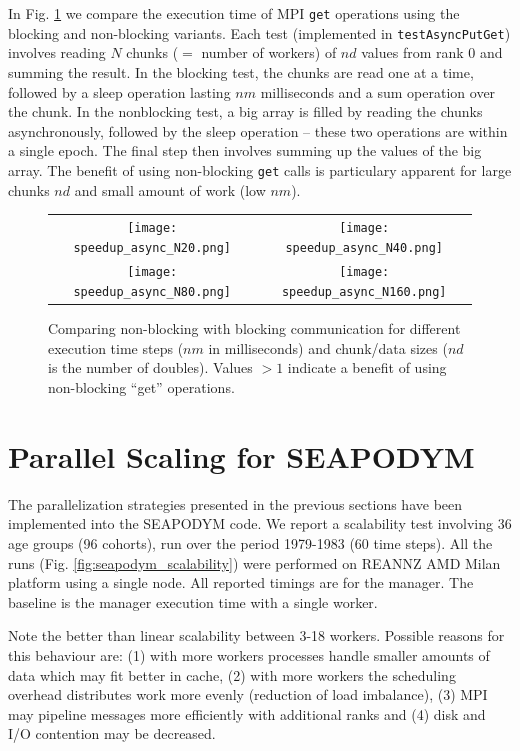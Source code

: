 \documentclass[a4paper,oneside,12pt]{article}
\begin{document}
In Fig. \ref{fig:async} we compare the  execution time of MPI \verb|get| operations using 
the blocking and non-blocking variants. Each test (implemented in \verb|testAsyncPutGet|) involves reading $N$ chunks ($=$ number of workers) 
of $nd$ values from rank 0 and summing the result. In the blocking test, the chunks are read one at a 
time, followed by a sleep operation lasting $nm$ milliseconds and a sum operation over the chunk. 
In the nonblocking test, a big array is filled by reading the chunks asynchronously, followed by the 
sleep operation -- these two operations are within a single epoch. The final step then involves summing up the values
of the big array. The benefit of using non-blocking \verb|get| calls is particulary apparent for large chunks 
$nd$ and small amount of work (low $nm$).

\begin{figure}
\begin{tabular}{cc}
      \texttt{[image: speedup\_async\_N20.png]} & \texttt{[image: speedup\_async\_N40.png]} \\
      \texttt{[image: speedup\_async\_N80.png]} & \texttt{[image: speedup\_async\_N160.png]} \\
\end{tabular}
\caption{Comparing non-blocking with blocking communication for different execution time steps ($nm$ in milliseconds) 
and chunk/data sizes ($nd$ is the number of doubles). Values $> 1$ indicate a benefit of using non-blocking ``get'' operations.}
\label{fig:async}
\end{figure}

\section{Parallel Scaling for SEAPODYM}

The parallelization strategies presented in the previous sections have been implemented into the SEAPODYM code. 
We report a scalability test involving 36 age groups (96 cohorts), run over the period 1979-1983 (60 time steps). 
All the runs (Fig. \ref{fig:seapodym_scalability}) were performed on REANNZ AMD Milan
platform using a single node. All reported timings are for the manager. The baseline is the manager execution time 
with a single worker.

Note the better than linear scalability between 3-18 workers. Possible reasons for this behaviour are:
(1) with more workers processes handle smaller amounts of data which may fit better in cache, (2) with more workers the 
scheduling overhead distributes work more evenly (reduction of load imbalance), (3) MPI may pipeline messages more efficiently with 
additional ranks and (4) disk and I/O contention may be decreased.
\end{document}
